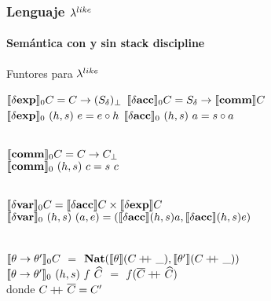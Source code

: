 \documentclass{beamer}
\begin{document}
\begin{frame}
\frametitle{Lenguaje $\lambda^{like}$}
\framesubtitle{Semántica con y sin stack discipline}

\begin{block}{Funtores para $\lambda^{like}$}

$\llbracket \delta \textbf{exp} \rrbracket_{0}C = C \rightarrow (S_{\delta})_{\bot}$
\quad \quad \quad \quad \quad 
$\llbracket \delta \textbf{acc} \rrbracket_{0}C = S_{\delta} \rightarrow \llbracket \textbf{comm} \rrbracket C$\\
$\llbracket \delta \textbf{exp} \rrbracket_{0} \ (h,s) \ e = e \circ h$
\quad \quad \quad \quad \quad 
$\semBrcks{\deltaacc}_{0} \ (h,s) \ a = s \circ a$\\

\

$\llbracket \textbf{comm} \rrbracket_{0}C = C \rightarrow C_{\bot}$\\
$\semBrcks{\commt}_{0} \ (h,s) \ c = s \ c$ \\

\

$\llbracket \delta \textbf{var} \rrbracket_{0}C = \llbracket \delta \textbf{acc} \rrbracket C \times \llbracket \delta \textbf{exp} \rrbracket C$\\
$\llbracket \delta \textbf{var} \rrbracket_{0} \ (h,s) \ (a,e) = 
			(\llbracket \delta \textbf{acc} \rrbracket(h,s)a,\llbracket \delta \textbf{acc} \rrbracket(h,s)e)$\\
			
\

$\llbracket \theta \rightarrow \theta' \rrbracket_0 C$ $=$ 
					$\textbf{Nat}(\llbracket \theta \rrbracket(C +\kern-1.3ex+\kern0.8ex \_),\llbracket \theta' \rrbracket(C +\kern-1.3ex+\kern0.8ex \_))$\\
\indent
$\semBrcks{\theta \rightarrow \theta'}_0 \ (h,s) \ f \ \widehat{C}$ $=$ 
														$f(\overline{C} +\kern-1.3ex+\kern0.8ex \widehat{C})$\\
\indent \indent donde $C +\kern-1.3ex+\kern0.8ex \overline{C} = C'$\\

\end{block}

\end{frame}
\end{document}
